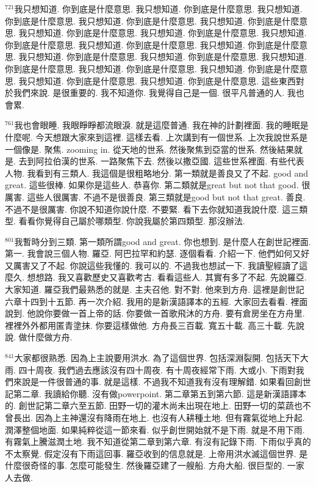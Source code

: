 \documentclass{book}
\begin{document}
$^{721}$我只想知道.
你到底是什麼意思.
我只想知道.
你到底是什麼意思.
我只想知道.
你到底是什麼意思.
我只想知道.
你到底是什麼意思.
我只想知道.
你到底是什麼意思.
我只想知道.
你到底是什麼意思.
我只想知道.
你到底是什麼意思.
我只想知道.
你到底是什麼意思.
我只想知道.
你到底是什麼意思.
我只想知道.
你到底是什麼意思.
我只想知道.
你到底是什麼意思.
我只想知道.
你到底是什麼意思.
我只想知道.
你到底是什麼意思.
我只想知道.
你到底是什麼意思.
我只想知道.
你到底是什麼意思.
我只想知道.
你到底是什麼意思.
我只想知道.
你到底是什麼意思.
這些東西對於我們來說.
是很重要的.
我不知道你.
我覺得自己是一個.
很平凡普通的人.
我也會累.

$^{761}$我也會眼睡.
我眼睜睜都流眼淚.
就是這麼普通.
我在神的計劃裡面.
我的睡眠是什麼呢.
今天想跟大家來到這裡.
這樣去看.
上次講到有一個世系.
上次我說世系是一個像是.
聚焦.
zooming in.
從天地的世系.
然後聚焦到亞當的世系.
然後結果就是.
去到阿拉伯漢的世系.
一路聚焦下去.
然後以撒亞國.
這些世系裡面.
有些代表人物.
我看到有三類人.
我這個是很粗略地分.
第一類就是善良又了不起.
good and great.
這些很棒.
如果你是這些人.
恭喜你.
第二類就是great but not that good.
很厲害.
這些人很厲害.
不過不是很善良.
第三類就是good but not that great.
善良.
不過不是很厲害.
你說不知道你說什麼.
不要緊.
看下去你就知道我說什麼.
這三類型.
看看你覺得自己屬於哪類型.
你說我屬於第四類型.
那沒辦法.

$^{801}$我暫時分到三類.
第一類所謂good and great.
你也想到.
是什麼人在創世記裡面.
第一.
我會說三個人物.
羅亞.
阿巴拉罕和約瑟.
逐個看看.
介紹一下.
他們如何又好又厲害又了不起.
你說這些我懂的.
我可以的.
不過我也想試一下.
我讀聖經讀了這麼久.
想想路.
我又喜歡歷史又喜歡考古.
看看這些人.
其實有多了不起.
先說羅亞.
大家知道.
羅亞我們最熟悉的就是.
主夫召他.
對不對.
他來到方舟.
這裡是創世記六章十四到十五節.
再一次介紹.
我用的是新漢語譯本的五經.
大家回去看看.
裡面說到.
他說你要做一首上帝的話.
你要做一首歌飛沐的方舟.
要有倉房坐在方舟里.
裡裡外外都用匿青塗抹.
你要這樣做他.
方舟長三百載.
寬五十載.
高三十載.
先說說.
做什麼做方舟.

$^{841}$大家都很熟悉.
因為上主說要用洪水.
為了這個世界.
包括深淵裂開.
包括天下大雨.
四十周夜.
我們過去應該沒有四十周夜.
有十周夜經常下雨.
大或小.
下雨對我們來說是一件很普通的事.
就是這樣.
不過我不知道我有沒有理解錯.
如果看回創世記第二章.
我讀給你聽.
沒有做powerpoint.
第二章第五到第六節.
這是新漢語譯本的.
創世記第二章六至五節.
田野一切的灌木尚未出現在地上.
田野一切的菜蔬也不曾長出.
因為上主神還沒有降雨在地上.
也沒有人耕種土地.
但有霧氣從地上升起.
潤澤整個地面.
如果純粹從這一節來看.
似乎創世開始就不是下雨.
就是不用下雨.
有霧氣上騰滋潤土地.
我不知道從第二章到第六章.
有沒有記錄下雨.
下雨似乎真的不太察覺.
假定沒有下雨這回事.
羅亞收到的信息就是.
上帝用洪水滅這個世界.
是什麼很奇怪的事.
怎麼可能發生.
然後羅亞建了一艘船.
方舟大船.
很巨型的.
一家人去做.
\end{document}
